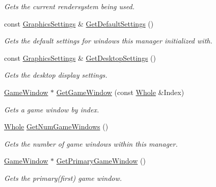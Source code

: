 \begin{DoxyCompactItemize}
\begin{DoxyCompactList}\small\item\em Gets the current rendersystem being used. \item\end{DoxyCompactList}\item 
const \hyperlink{structMezzanine_1_1GraphicsSettings}{GraphicsSettings} \& \hyperlink{classMezzanine_1_1GraphicsManager_aba36bc3b2e611eb3c3d47fab001805ab}{GetDefaultSettings} ()
\begin{DoxyCompactList}\small\item\em Gets the default settings for windows this manager initialized with. \item\end{DoxyCompactList}\item 
const \hyperlink{structMezzanine_1_1GraphicsSettings}{GraphicsSettings} \& \hyperlink{classMezzanine_1_1GraphicsManager_ab1a5df9df45a309ef4ce485a36bc9327}{GetDesktopSettings} ()
\begin{DoxyCompactList}\small\item\em Gets the desktop display settings. \item\end{DoxyCompactList}\item 
\hyperlink{classMezzanine_1_1GameWindow}{GameWindow} $\ast$ \hyperlink{classMezzanine_1_1GraphicsManager_a68e71521280ae7261982c98642740c03}{GetGameWindow} (const \hyperlink{namespaceMezzanine_adcbb6ce6d1eb4379d109e51171e2e493}{Whole} \&Index)
\begin{DoxyCompactList}\small\item\em Gets a game window by index. \item\end{DoxyCompactList}\item 
\hyperlink{namespaceMezzanine_adcbb6ce6d1eb4379d109e51171e2e493}{Whole} \hyperlink{classMezzanine_1_1GraphicsManager_ab7d1b160ed4990dfb11687b2d17c2fda}{GetNumGameWindows} ()
\begin{DoxyCompactList}\small\item\em Gets the number of game windows within this manager. \item\end{DoxyCompactList}\item 
\hyperlink{classMezzanine_1_1GameWindow}{GameWindow} $\ast$ \hyperlink{classMezzanine_1_1GraphicsManager_ae6f11a5938b22f75a9721083e53b1307}{GetPrimaryGameWindow} ()
\begin{DoxyCompactList}\small\item\em Gets the primary(first) game window. \item\end{DoxyCompactList}\item 

\end{DoxyCompactItemize}
